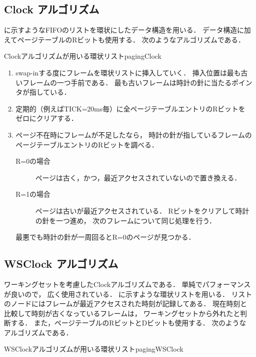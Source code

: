 \subsection{Clock アルゴリズム}
に示すようなFIFOのリストを環状にしたデータ構造を用いる．
データ構造に加えてページテーブルのRビットも使用する．
次のようなアルゴリズムである．

         {Clockアルゴリズムが用いる環状リスト}{pagingClock}

\begin{enumerate}
\item swap-inする度にフレームを環状リストに挿入していく．
  挿入位置は最も古いフレームの一つ手前である．
  最も古いフレームは時計の針に当たるポインタが指している．
\item 定期的（例えばTICK=20ms毎）に全ページテーブルエントリのRビットを
  ゼロにクリアする．
\item ページ不在時にフレームが不足したなら，
  時計の針が指しているフレームのページテーブルエントリのRビットを調べる．
  \begin{description}
  \item[R=0の場合]
    ページは古く，かつ，最近アクセスされていないので置き換える．
  \item[R=1の場合]
    ページは古いが最近アクセスされている．
    Rビットをクリアして時計の針を一つ進め，
    次のフレームについて同じ処理を行う．
  \end{description}
  最悪でも時計の針が一周回るとR=0のページが見つかる．
\end{enumerate}

\subsection{WSClock アルゴリズム}
ワーキングセットを考慮したClockアルゴリズムである．
単純でパフォーマンスが良いので，
広く使用されている\cite{wsClock}．
に示すような環状リストを用いる．
リストのノードにはフレームが最近アクセスされた時刻が記録してある．
現在時刻と比較して時刻が古くなっているフレームは，
ワーキングセットから外れたと判断する．
また，ページテーブルのRビットとDビットも使用する．
次のようなアルゴリズムである．

         {WSClockアルゴリズムが用いる環状リスト}{pagingWSClock}

